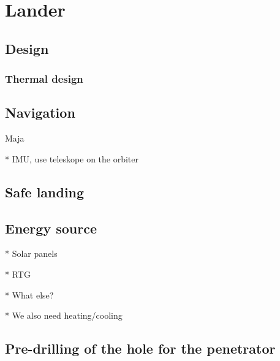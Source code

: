 \chapter{Lander}

\section{Design}

\subsection{Thermal design}

\section{Navigation}
Maja

* IMU, use teleskope on the orbiter

\section{Safe landing}

\section{Energy source}

* Solar panels

* RTG

* What else?

* We also need heating/cooling

\section{Pre-drilling of the hole for the penetrator}
